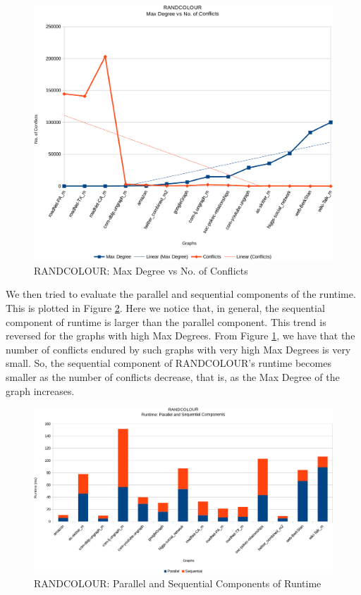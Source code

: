 \documentclass[MTech]{iitmdiss}
\begin{document}
\begin{figure}[h]
    \centering
    \includegraphics[width=\textwidth,keepaspectratio=true]{chartNewest3.pdf}
    \caption{
        RANDCOLOUR: Max Degree vs No. of Conflicts
    }
    \label{fig:chart3}
\end{figure}

We then tried to evaluate the parallel and sequential components of the runtime. This is plotted in Figure \ref{fig:chart2}. Here we notice that, in general, the sequential component of runtime is larger than the parallel component. This trend is reversed for the graphs with high Max Degrees. From Figure \ref{fig:chart3}, we have that the number of conflicts endured by such graphs with very high Max Degrees is very small. So, the sequential component of RANDCOLOUR's runtime becomes smaller as the number of conflicts decrease, that is, as the Max Degree of the graph increases. 

\begin{figure}[h]
    \centering
    \includegraphics[width=\textwidth,keepaspectratio=true]{chartNewest2.pdf}
    \caption{
        RANDCOLOUR: Parallel and Sequential Components of Runtime
    }
    \label{fig:chart2}
\end{figure}
\end{document}
